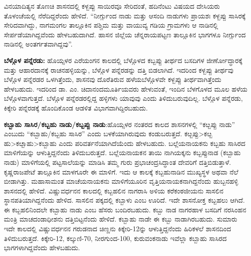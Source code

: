 ವಿನಯಾದಿತ್ಯನ ತೊಣಚಿ ಶಾಸನದಲ್ಲಿ ಕಳ್ಬಪ್ಪು ಸಾಯಿರವೂ ಸೇರಿದಂತೆ, ಹದಿನೆಂಟು ವಿಷಯದ ದೇಸಿಯರು ತೊಳಂಚೆಯಲ್ಲಿ ನೆರೆದಿದ್ದರೆಂದು ಹೇಳಿದೆ. “ನೀರ್ಗ್ಗುಂದ ನಾಡು ಮತ್ತು ಆಸಂದಿ ನಾಡುಗಳು ಪ್ರಾಯಶಃ ಕಳ್ಬಪ್ಪು ಸಾಸಿರಕ್ಕೆ ಸೇರಿದವಾಗಿದ್ದು, ನಾಗಮಂಗಲ ತಾಲ್ಲೂಕಿನ ಪಶ್ಚಿಮ ಮತ್ತು ವಾಯುವ್ಯ ಗಡಿಯ ಗ್ರಾಮಗಳು ಆ ನಾಡಿನಲ್ಲಿ ಸೇರ್ಪಡೆಯಾಗಿದ್ದವೆಂದು ಹೇಳಬಹುದಾಗಿದೆ. ಹಾಸನ ಜಿಲ್ಲೆಯ ಚೆನ್ನರಾಯಪಟ್ಟಣ ತಾಲ್ಲೂಕಿನ ಭಾಗಗಳೂ ನೀರ್ಗ್ಗುಂದ ನಾಡಿನಲ್ಲಿ ಅಂತರ್ಗತ\-ವಾಗಿದ್ದವು”.

\textbf{ಬೆಳ್ಗೊಳ ಪನ್ನೆರಡು:} ಹೊಯ್ಸಳರ ಎರೆಯಂಗನ ಕಾಲದಲ್ಲಿ ಬೆಳ್ಗೊಳದ ಕಬ್ಬಪ್ಪು ತೀರ್ಥದ ಬಸದಿಗಳ ಜೀರ್ಣೋದ್ಧಾರಕ್ಕೆ ಮತ್ತು ಆಹಾರದಾನಕ್ಕೆ ರಾಚನಹಳ್ಳಿಯನ್ನು, ಬೆಳ್ಗೊಳ ಪನ್ನೆರಡನ್ನು ದತ್ತಿ ಬಿಡಲಾಗಿದೆ. ಇದರಿಂದ ಕಳ್ಬಪ್ಪು ತೀರ್ಥವು ಬೆಳ್ಗೊಳ ಪನ್ನೆರಡರ ಒಳಗಿತ್ತೆಂದು, ಶಾಸನವು ದೊರೆತಿರುವ ಹಳೆಯಬೆಳ್ಗೊಳವೇ ಕಳ್ಬಪ್ಪು ತೀರ್ಥವಾಗಿತ್ತೆಂದು ಹೇಳಬಹುದು. ಇದರಿಂದ ಡಾ. ಎಂ. ಚಿದಾನಂದಮೂರ್ತಿಯವರು ಹೇಳುವಂತೆ, ಇಂದಿನ ಬೆಳಗೊಳದ ಮೂಲ ಹಳೆಯ ಬೆಳ್ಗೊಳವಾಗುತ್ತದೆ. ಬೆಳ್ಗೊಳ ಪನ್ನೆರಡರಲ್ಲಿದ್ದ ಹಳ್ಳಿಗಳು ಯಾವುವು ಎಂದು ತಿಳಿದುಬರುವುದಿಲ್ಲ. ಬೆಳ್ಗೊಳ ಪನ್ನೆರಡು, ಕಿಕ್ಕೇರಿ ಪನ್ನೆರಡಕ್ಕೆ ಹೊಂದಿಕೊಂಡ ಆಡಳಿತ ವಿಭಾಗವಾಗಿದ್ದಿರಬಹುದು.

\textbf{ಕಬ್ಬಾಹು ಸಾಸಿರ/ಕಬ್ಬಹು ನಾಡು/ಕಬ್ಬಪ್ಪು ನಾಡು}:ಹೊಯ್ಸಳರ ನಂತರದ ಕಾಲದ ಶಾಸನಗಳಲ್ಲಿ “ಕೞ್ಬಪ್ಪು ನಾಡು” ಎಂಬುದು “ಕಬ್ಬಾಹು/ಕಬ್ಬಹು ಸಾಸಿರ” ಎಂದು ಬಳಕೆಯಾಗಿರುವುದು ಕಂಡುಬರುತ್ತದೆ. ಕೞ್ಬಪ್ಪು\textgreater  ಕೞ್ಬ ಹು\textgreater ಕೞ್ಬಾಹು\textgreater ಕಬ್ಬಾಹು ಎಂದು ಪರಿವರ್ತನೆಯಾಗಿದೆಯೆಂದು ಹೇಳಬಹುದು. ಬಲ್ಲೆಯನಾಯಕನು ಕಬ್ಬಹು ಸಾಸಿರದ ಮಾಳಿಗೆಯನ್ನು ಆಳುತ್ತಿದ್ದನೆಂದು ತಿಳಿದುಬರುತ್ತದೆ. ಬಲ್ಲೆಯನಾಯಕನ ತಾಯಿ ನಾಗಿಯಕ್ಕನು ಕಬ್ಬಪ್ಪುನಾಡ (ಕಬ್ಬಾಹು ನಾಡು) ಮಾಳಿಗೆಯಲ್ಲಿ ಪಟ್ಟಸಾಲೆ\-ಯನ್ನು ಮಾಡಿಸಿ ತಮ್ಮ ಗುರು ಪ್ರಭಾಚಂದ್ರಸಿದ್ಧಾಂತ ದೇವರಿಗೆ ದತ್ತಿಬಿಡುತ್ತಾಳೆ. ಕೃಷ್ಣರಾಜಪೇಟೆ ತಾಲ್ಲೂಕಿನ ಮಾಳಗೂರೇ ಈ ಮಾಳಿಗೆ. ಇದು ಆ ಕಾಲಕ್ಕೆ ಕಬ್ಬಹುನಾಡಿನ ಮುಖ್ಯಸ್ಥಳ ಅಥವಾ ನೆಲೆ ಬೀಡಾಗಿತ್ತು.\- ಮಹಾಸಾಮಂತ ಮಾಚೆಯನಾಯಕನು ಮಾಳಿಗೆಯೂರಿನ ವೃತ್ತಿಯನಾಯಕನಾಗಿದ್ದನೆಂದು ಹುಬ್ಬನಹಳ್ಳಿ ಶಾಸನದಲ್ಲಿ ಹೇಳಿದೆ. ವಿಷ್ಣುವರ್ಧನನ ಕಾಲದಲ್ಲಿ ಕಬ್ಬಹಲಿನ ನಾಗರಾಸಿ ಅಳಿಯ ಕರೆಕಂಠಜೀಯನು ಸಾಸಲಿನ ಸ್ಥಾನಪತಿಯಾಗಿದ್ದನೆಂದು ಹೇಳಿದ. ಸಾಸಲಿನ ಪಕ್ಕದಲ್ಲಿ ಕಬ್ಬಾಳು ಎಂಬ ಊರಿದೆ. ಇದೇ ಶಾಸನೋಕ್ತ ಕಬ್ಬಹಲು ಆಗಿದೆ. ಈ ಕಬ್ಬಹಲಿನಿಂದಲೇ ಕಬ್ಬಾಹು ನಾಡು ಎಂಬ ಹೆಸರು ಬಂದಿರಬಹುದು. ಕಬ್ಬು ನಾಡ ನಾಗರಹಾಳ ಬಸದಿಗೆ ನರಸಿಂಹನ ಮಂತ್ರಿ ಮಾಚದಂಡಾಧೀಶನು ದತ್ತಿಬಿಟ್ಟನೆಂದು ಹೇಳಿದೆ. ಕಬ್ಬಾಹು ನಾಡೇ ಈ ಕಬ್ಬು ನಾಡಾಗಿರಬಹುದು. ಸುಮಾರು ಇದೇ ಕಾಲದಲ್ಲಿ ವಿಷ್ಣುವರ್ಧನನ ಗರುಡನಾದ ಚಿಣ್ಣನು ಕಿಕ್ಕೇರಿ-12ನ್ನು ಆಳುತ್ತಿದ್ದನೆಂದು ಹಿರಿಕಳಲೆ ಶಾಸನದಿಂದ ತಿಳಿದುಬರುತ್ತದೆ. ಕಿಕ್ಕೇರಿ-12, ಕಲ್ಕುಣಿ-70, ನೀರಗುಂದ-100, ಕುರುವಂಕನಾಡು ಇವೆಲ್ಲಾ ಕಬ್ಬಾಹು ಸಾಸಿರದ ಭಾಗಗಳಾಗಿದ್ದವೆಂದು ಹೇಳಬಹುದು.

